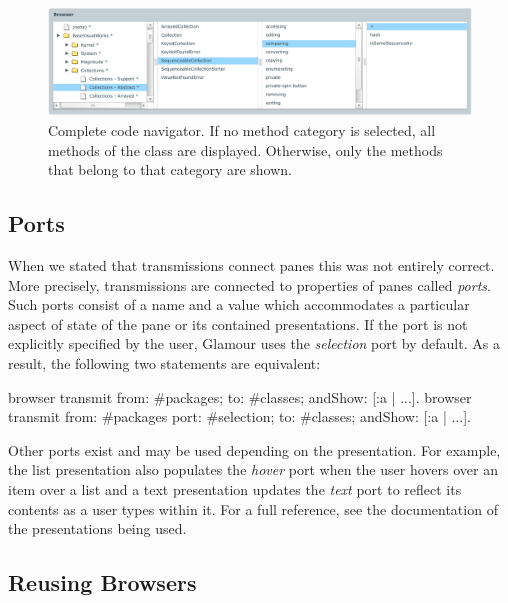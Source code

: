 \documentclass[a4paper,10pt,twoside]{book}
\begin{document}
\begin{figure}[htbp]
\centerline{\includegraphics[width=\linewidth]{codenavigator.pdf}}
\caption{Complete code navigator. If no method category is selected, all methods of the class
are displayed. Otherwise, only the methods that belong to that category are shown.}
\label{fig:codenavigator}
\end{figure}


\subsection{Ports}

When we stated that transmissions connect panes this was not entirely
correct. More precisely, transmissions are connected to properties of
panes called \emph{ports}. Such ports consist of a name and a value
which accommodates a particular aspect of state of the pane or its
contained presentations. If the port is not explicitly specified by
the user, Glamour uses the \emph{selection} port by default. As a
result, the following two statements are equivalent:

\begin{code}{}
browser transmit from: #packages; to: #classes; andShow: [:a | ...].
browser transmit from: #packages port: #selection; to: #classes; andShow: [:a | ...].
\end{code}


Other ports exist and may be used depending on the presentation. For
example, the list presentation also populates the \emph{hover} port
when the user hovers over an item over a list and a text presentation
updates the \emph{text} port to reflect its contents as a user types
within it. For a full reference, see the documentation of the
presentations being used.


\subsection{Reusing Browsers}
\label{sec:tutorial/reusing-browsers}
\end{document}
